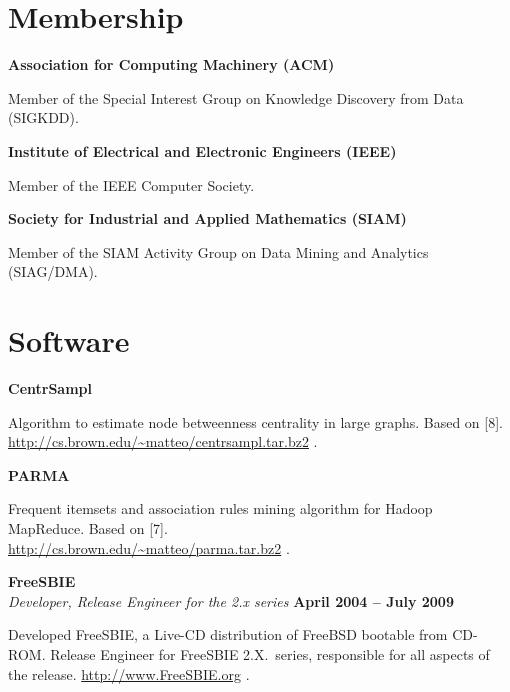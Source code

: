 \documentclass[margin,line]{resume}
\begin{document}
\section{\sc Membership}
{\bf Association for Computing Machinery (ACM)}
\begin{list2}
\vspace*{.05in}
\item Member of the Special Interest Group on Knowledge Discovery from Data (SIGKDD).
\end{list2}
{\bf Institute of Electrical and Electronic Engineers (IEEE)}
\begin{list2}
\vspace*{.05in}
\item Member of the IEEE Computer Society.
\end{list2}
{\bf Society for Industrial and Applied Mathematics (SIAM)}
\begin{list2}
\vspace*{.05in}
\item Member of the SIAM Activity Group on Data Mining and Analytics
  (SIAG/DMA).
\end{list2}

\section{\sc Software}

{\bf CentrSampl}
\begin{list2}
  \vspace*{.05in}
\item Algorithm to estimate node betweenness centrality in large graphs. Based
  on [8]. \\\url{http://cs.brown.edu/~matteo/centrsampl.tar.bz2} .
\end{list2}

{\bf PARMA}
\begin{list2}
  \vspace*{.05in}
\item Frequent itemsets and association rules mining algorithm for Hadoop MapReduce.
  Based on [7]. \\\url{http://cs.brown.edu/~matteo/parma.tar.bz2} .
\end{list2}

{\bf FreeSBIE }\\
{\em Developer, Release Engineer for the 2.x series} \hfill{\bf April 2004 --
July 2009}

\begin{list2}
\vspace*{.05in}
\item Developed FreeSBIE, a Live-CD distribution of FreeBSD bootable from CD-ROM.
Release Engineer for FreeSBIE 2.X.~series, responsible for all aspects of
the release. \url{http://www.FreeSBIE.org} .
\end{list2}
\end{document}
